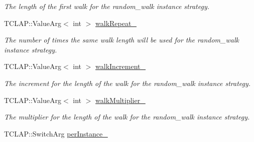 \begin{DoxyCompactItemize}
\begin{DoxyCompactList}\small\item\em The length of the first walk for the random\+\_\+walk instance strategy. \end{DoxyCompactList}\item 
T\+C\+L\+A\+P\+::\+Value\+Arg$<$ int $>$ \hyperlink{structslb_1_1core_1_1commandLine_1_1CommandLine_a9142c260196e2ca04c224f2f2d573520}{walk\+Repeat\+\_\+}\hypertarget{structslb_1_1core_1_1commandLine_1_1CommandLine_a9142c260196e2ca04c224f2f2d573520}{}\label{structslb_1_1core_1_1commandLine_1_1CommandLine_a9142c260196e2ca04c224f2f2d573520}

\begin{DoxyCompactList}\small\item\em The number of times the same walk length will be used for the random\+\_\+walk instance strategy. \end{DoxyCompactList}\item 
T\+C\+L\+A\+P\+::\+Value\+Arg$<$ int $>$ \hyperlink{structslb_1_1core_1_1commandLine_1_1CommandLine_a2d36d8bff4166018f7235960d02e58e4}{walk\+Increment\+\_\+}\hypertarget{structslb_1_1core_1_1commandLine_1_1CommandLine_a2d36d8bff4166018f7235960d02e58e4}{}\label{structslb_1_1core_1_1commandLine_1_1CommandLine_a2d36d8bff4166018f7235960d02e58e4}

\begin{DoxyCompactList}\small\item\em The increment for the length of the walk for the random\+\_\+walk instance strategy. \end{DoxyCompactList}\item 
T\+C\+L\+A\+P\+::\+Value\+Arg$<$ int $>$ \hyperlink{structslb_1_1core_1_1commandLine_1_1CommandLine_a2afcb83006b9f428e6cd8bab05697bc2}{walk\+Multiplier\+\_\+}\hypertarget{structslb_1_1core_1_1commandLine_1_1CommandLine_a2afcb83006b9f428e6cd8bab05697bc2}{}\label{structslb_1_1core_1_1commandLine_1_1CommandLine_a2afcb83006b9f428e6cd8bab05697bc2}

\begin{DoxyCompactList}\small\item\em The multiplier for the length of the walk for the random\+\_\+walk instance strategy. \end{DoxyCompactList}\item 
T\+C\+L\+A\+P\+::\+Switch\+Arg \hyperlink{structslb_1_1core_1_1commandLine_1_1CommandLine_a7f35a809f1c1b6ccbf080d2cb6109a22}{per\+Instance\+\_\+}\hypertarget{structslb_1_1core_1_1commandLine_1_1CommandLine_a7f35a809f1c1b6ccbf080d2cb6109a22}{}\label{structslb_1_1core_1_1commandLine_1_1CommandLine_a7f35a809f1c1b6ccbf080d2cb6109a22}


\end{DoxyCompactItemize}
